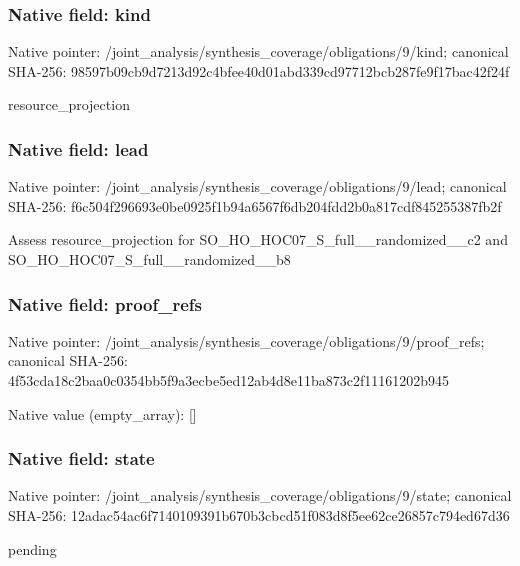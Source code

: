 \documentclass[10pt,a4paper]{article}
\begin{document}
\subsubsection{Native field: kind}
Native pointer: /joint\_\allowbreak{}analysis/synthesis\_\allowbreak{}coverage/obligations/9/kind; canonical SHA-256: 98597b09cb9d7213d92c4bfee40d01abd339cd97712bcb287fe9f17bac42f24f

\begingroup\raggedright\sloppy resource\_\allowbreak{}projection\par\endgroup

\subsubsection{Native field: lead}
Native pointer: /joint\_\allowbreak{}analysis/synthesis\_\allowbreak{}coverage/obligations/9/lead; canonical SHA-256: f6c504f296693e0be0925f1b94a6567f6db204fdd2b0a817cdf845255387fb2f

\begingroup\raggedright\sloppy Assess resource\_\allowbreak{}projection for SO\_\allowbreak{}HO\_\allowbreak{}HOC07\_\allowbreak{}S\_\allowbreak{}full\_\allowbreak{}\_\allowbreak{}randomized\_\allowbreak{}\_\allowbreak{}c2 and SO\_\allowbreak{}HO\_\allowbreak{}HOC07\_\allowbreak{}S\_\allowbreak{}full\_\allowbreak{}\_\allowbreak{}randomized\_\allowbreak{}\_\allowbreak{}b8\par\endgroup

\subsubsection{Native field: proof\_\allowbreak{}refs}
Native pointer: /joint\_\allowbreak{}analysis/synthesis\_\allowbreak{}coverage/obligations/9/proof\_\allowbreak{}refs; canonical SHA-256: 4f53cda18c2baa0c0354bb5f9a3ecbe5ed12ab4d8e11ba873c2f11161202b945

Native value (empty\_\allowbreak{}array): []

\subsubsection{Native field: state}
Native pointer: /joint\_\allowbreak{}analysis/synthesis\_\allowbreak{}coverage/obligations/9/state; canonical SHA-256: 12adac54ac6f7140109391b670b3cbcd51f083d8f5ee62ce26857c794ed67d36

\begingroup\raggedright\sloppy pending\par\endgroup
\end{document}
